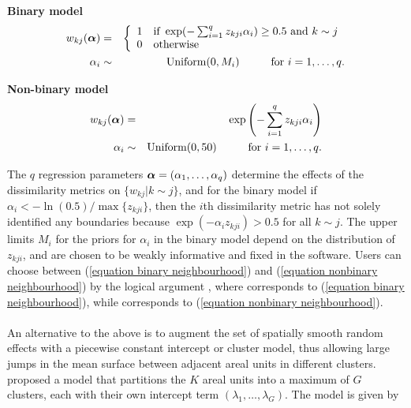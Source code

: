 \documentclass[article,shortnames,nojss]{jss}
\newcommand{\bd}[1]{\ensuremath{\mbox{\boldmath $#1$}}}
\begin{document}
\textbf{Binary model}
\begin{eqnarray}
w_{kj}(\bd{\alpha})&=&\left\{ \begin{array}{ll}
1&\mbox{if }\exp(-\sum_{i=1}^{q}z_{kji}\alpha_{i})\geq0.5 \mbox{ and } k\sim j\\
0&\mbox{otherwise}\\\end{array}\right.\label{equation binary neighbourhood}\\
\alpha_{i}&\sim&\mbox{Uniform}(0, M_{i})\hspace{1cm}\mbox{for $i=1,\ldots,q$.}\nonumber
\end{eqnarray}

\textbf{Non-binary model}
\begin{eqnarray}
w_{kj}(\bd{\alpha})&=&\exp\left(-\sum_{i=1}^{q}z_{kji}\alpha_{i}\right)\label{equation nonbinary neighbourhood}\\
\alpha_{i}&\sim&\mbox{Uniform}(0, 50)\hspace{1cm}\mbox{for $i=1,\ldots,q$.}\nonumber
\end{eqnarray}

The $q$ regression parameters $\bd{\alpha}=(\alpha_{1},\ldots,\alpha_{q})$ determine the effects of the dissimilarity metrics on $\{w_{kj}|k\sim j\}$, and for the binary model if $\alpha_i<-\ln(0.5)/\max\{z_{kji}\}$, then the $i$th dissimilarity metric has not solely identified any  boundaries because $\exp(-\alpha_i z_{kji})>0.5$ for all $k\sim j$. The upper limits $M_{i}$ for the priors for $\alpha_i$ in the binary model depend on the distribution of $z_{kji}$, and are chosen to be weakly informative and fixed in the software. Users can choose between (\ref{equation binary neighbourhood}) and (\ref{equation nonbinary neighbourhood}) by the logical argument , where  corresponds to (\ref{equation binary neighbourhood}), while  corresponds to (\ref{equation nonbinary neighbourhood}).\\


\\
An alternative to the above is to augment the set of spatially smooth random effects with a piecewise constant intercept or cluster model, thus allowing large jumps in the mean surface between adjacent areal units in different clusters. \cite{lee2015} proposed a model that partitions the $K$ areal units into a maximum of $G$ clusters, each with their own intercept term $(\lambda_{1},\ldots,\lambda_{G})$. The  model is given by
\end{document}
